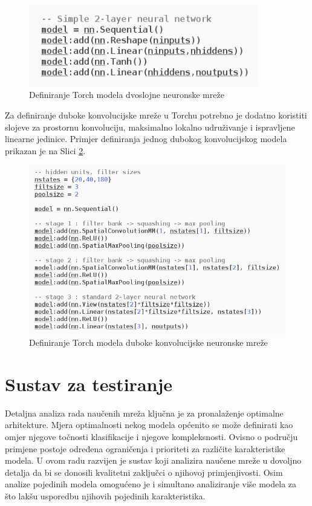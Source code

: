 \documentclass[lmodern, utf8, diplomski, numeric]{fer}
\begin{document}
\begin{figure}[ht!]
\centering
\includegraphics[width=10cm]{slike/nn_model.png}
\caption{Definiranje Torch modela dvoslojne neuronske mreže}
\label{fig:nnmodel}
\end{figure}
\FloatBarrier

Za definiranje duboke konvolucijske mreže u Torchu potrebno je dodatno koristiti slojeve za prostornu konvoluciju, maksimalno lokalno udruživanje i ispravljene linearne jedinice. Primjer definiranja jednog dubokog konvolucijskog modela prikazan je na Slici \ref{fig:cnntorch}.

\begin{figure}[ht!]
\centering
\includegraphics[width=16cm]{slike/cnn_model.png}
\caption{Definiranje Torch modela duboke konvolucijske neuronske mreže}
\label{fig:cnntorch}
\end{figure}

\newpage

\section{Sustav za testiranje}

Detaljna analiza rada naučenih mreža ključna je za pronalaženje optimalne arhitekture. Mjera optimalnosti nekog modela općenito se može definirati kao omjer njegove točnosti klasifikacije i njegove kompleksnosti. Ovisno o području primjene postoje određena ograničenja i prioriteti za različite karakteristike modela. U ovom radu razvijen je sustav koji analizira naučene mreže u dovoljno detalja da bi se donosili kvalitetni zaključci o njihovoj primjenjivosti. Osim analize pojedinih modela omogućeno je i simultano analiziranje više modela za što lakšu usporedbu njihovih pojedinih karakteristika.  
\end{document}
